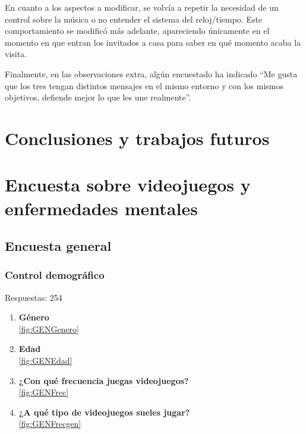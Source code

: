 \documentclass[12pt, a4paper,twoside,titlepage]{book}
\let\origdoublepage\cleardoublepage
\renewcommand{\cleardoublepage}{\clearpage{\pagestyle{empty}\origdoublepage}}
\begin{document}
En cuanto a los aspectos a modificar, se volvía a repetir la necesidad de un control sobre la música o no entender el sistema del reloj/tiempo. Este comportamiento se modificó más adelante, apareciendo únicamente en el momento en que entran los invitados a casa para saber en qué momento acaba la visita. 

Finalmente, en las observaciones extra, algún encuestado ha indicado ``Me gusta que los tres tengan distintos mensajes en el mismo entorno y con los mismos objetivos, defiende mejor lo que les une realmente''. 

\chapter{Conclusiones y trabajos futuros}



\cleardoublepage
{}
{}


\printbibliography
% 
%
%



\cleardoublepage
\appendix


\chapter{Encuesta sobre videojuegos y enfermedades mentales}
\label{sec:anexo}
\section{Encuesta general}

\subsection{Control demográfico}
Respuestas: 254
\begin{enumerate}[label=\textbf{\arabic*}.]
     \item \textbf{Género}\\
     \ref{fig:GENGenero}
     \item \textbf{Edad }\\
     \ref{fig:GENEdad}
     \item \textbf{¿Con qué frecuencia juegas videojuegos?}\\
     \ref{fig:GENFrec}
     \item \textbf{¿A qué tipo de videojuegos sueles jugar? }\\
     \ref{fig:GENFrecgen}
\end{enumerate}
\end{document}
